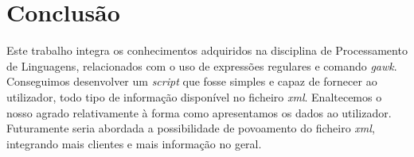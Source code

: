 \documentclass{report}
\begin{document}
\chapter{Conclusão}
	Este trabalho integra os conhecimentos adquiridos na disciplina de Processamento de Linguagens, relacionados com o uso de expressões regulares e comando \textit{gawk}.\\
\break
	Conseguimos desenvolver um \textit{script} que fosse simples e capaz de fornecer ao utilizador, todo tipo de informação disponível no ficheiro \textit{xml}. Enaltecemos o nosso agrado relativamente à forma como apresentamos os dados ao utilizador.\\
\break
	Futuramente seria abordada a possibilidade de povoamento do ficheiro \textit{xml}, integrando mais clientes e mais informação no geral.\\
\end{document}
